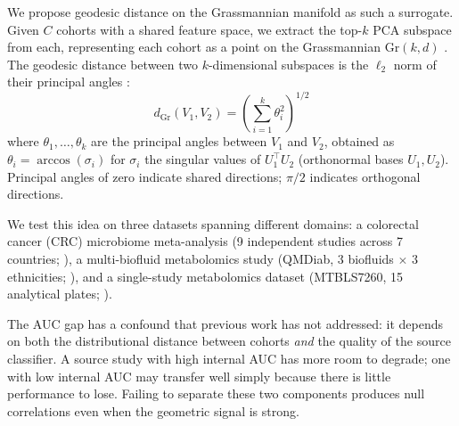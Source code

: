 \documentclass{article}
\begin{document}
We propose geodesic distance on the Grassmannian manifold as such a surrogate. Given $C$ cohorts with a shared feature space, we extract the top-$k$ PCA subspace from each, representing each cohort as a point on the Grassmannian $\mathrm{Gr}(k, d)$ \citep{edelman1998geometry}. The geodesic distance between two $k$-dimensional subspaces is the $\ell_2$ norm of their principal angles \citep{bjorck1973numerical, ye2016schubert}:
\begin{equation}
d_{\mathrm{Gr}}(V_1, V_2) = \left(\sum_{i=1}^{k} \theta_i^2\right)^{1/2}
\end{equation}
where $\theta_1, \ldots, \theta_k$ are the principal angles between $V_1$ and $V_2$, obtained as $\theta_i = \arccos(\sigma_i)$ for $\sigma_i$ the singular values of $U_1^\top U_2$ (orthonormal bases $U_1, U_2$). Principal angles of zero indicate shared directions; $\pi/2$ indicates orthogonal directions.

We test this idea on three datasets spanning different domains: a colorectal cancer (CRC) microbiome meta-analysis (9 independent studies across 7 countries; \citealp{wirbel2019meta}), a multi-biofluid metabolomics study (QMDiab, 3 biofluids $\times$ 3 ethnicities; \citealp{yousri2015metabolic}), and a single-study metabolomics dataset (MTBLS7260, 15 analytical plates; \citealp{leonletelier2024contributions}).

The AUC gap has a confound that previous work has not addressed: it depends on both the distributional distance between cohorts \emph{and} the quality of the source classifier. A source study with high internal AUC has more room to degrade; one with low internal AUC may transfer well simply because there is little performance to lose. Failing to separate these two components produces null correlations even when the geometric signal is strong.
\end{document}

